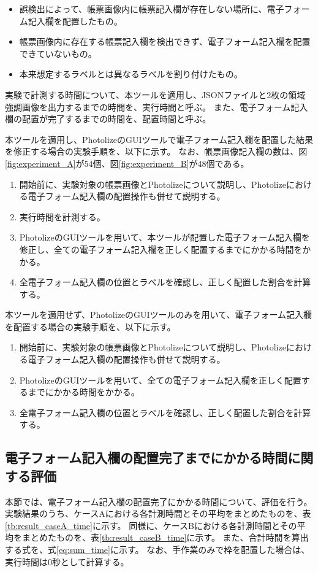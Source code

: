 \begin{itemize}
    \item 誤検出によって、帳票画像内に帳票記入欄が存在しない場所に、電子フォーム記入欄を配置したもの。
    \item 帳票画像内に存在する帳票記入欄を検出できず、電子フォーム記入欄を配置できていないもの。
    \item 本来想定するラベルとは異なるラベルを割り付けたもの。
\end{itemize}

実験で計測する時間について、本ツールを適用し、JSONファイルと2枚の領域強調画像を出力するまでの時間を、実行時間と呼ぶ。
また、電子フォーム記入欄の配置が完了するまでの時間を、配置時間と呼ぶ。

本ツールを適用し、PhotolizeのGUIツールで電子フォーム記入欄を配置した結果を修正する場合の実験手順を、以下に示す。
なお、帳票画像記入欄の数は、図\ref{fig:experiment_A}が54個、図\ref{fig:experiment_B}が48個である。

\begin{enumerate}
    \item 開始前に、実験対象の帳票画像とPhotolizeについて説明し、Photolizeにおける電子フォーム記入欄の配置操作も併せて説明する。
    \item 実行時間を計測する。
    \item PhotolizeのGUIツールを用いて、本ツールが配置した電子フォーム記入欄を修正し、全ての電子フォーム記入欄を正しく配置するまでにかかる時間をかかる。
    \item 全電子フォーム記入欄の位置とラベルを確認し、正しく配置した割合を計算する。
\end{enumerate}

本ツールを適用せず、PhotolizeのGUIツールのみを用いて、電子フォーム記入欄を配置する場合の実験手順を、以下に示す。

\begin{enumerate}
    \item 開始前に、実験対象の帳票画像とPhotolizeについて説明し、Photolizeにおける電子フォーム記入欄の配置操作も併せて説明する。
    \item PhotolizeのGUIツールを用いて、全ての電子フォーム記入欄を正しく配置するまでにかかる時間をかかる。
    \item 全電子フォーム記入欄の位置とラベルを確認し、正しく配置した割合を計算する。
\end{enumerate}

\subsection{電子フォーム記入欄の配置完了までにかかる時間に関する評価}\label{subsec:evalue_required_time}
本節では、電子フォーム記入欄の配置完了にかかる時間について、評価を行う。
実験結果のうち、ケースAにおける各計測時間とその平均をまとめたものを、表\ref{tb:result_caseA_time}に示す。
同様に、ケースBにおける各計測時間とその平均をまとめたものを、表\ref{tb:result_caseB_time}に示す。
また、合計時間を算出する式を、式\ref{eq:sum_time}に示す。
なお、手作業のみで枠を配置した場合は、実行時間は0秒として計算する。


